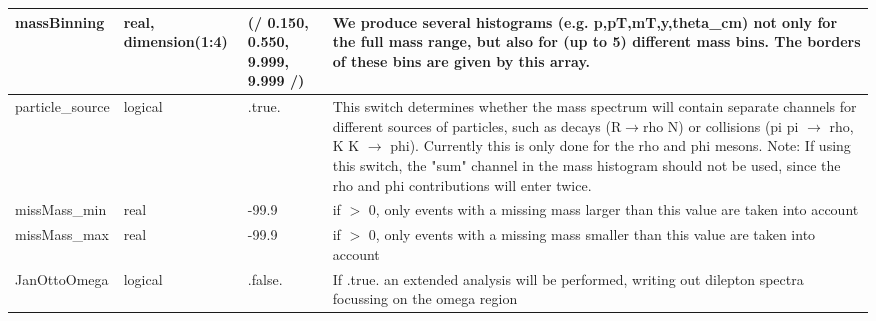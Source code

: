 \documentclass{article}
\begin{document}
\begin{longtable}{llll}
\midrule
massBinning & \begin{minipage}[t]{2cm}real, dimension(1:4)\end{minipage} & \begin{minipage}[t]{2cm}(/ 0.150, 0.550, 9.999, 9.999 /)\end{minipage} & \begin{minipage}[t]{12cm}We produce several histograms (e.g. p,pT,mT,y,theta\_cm) not only for the full mass range, but also for (up to 5) different mass bins. The borders of these bins are given by this array.\end{minipage}\\*
\midrule
particle\_source & \begin{minipage}[t]{2cm}logical\end{minipage} & \begin{minipage}[t]{2cm}.true.\end{minipage} & \begin{minipage}[t]{12cm}This switch determines whether the mass spectrum will contain separate channels for different sources of particles, such as decays (R$\rightarrow$rho N) or collisions (pi pi $\rightarrow$ rho, K K $\rightarrow$ phi). Currently this is only done for the rho and phi mesons. Note: If using this switch, the "sum" channel in the mass histogram should not be used, since the rho and phi contributions will enter twice.\end{minipage}\\*
\midrule
missMass\_min & \begin{minipage}[t]{2cm}real\end{minipage} & \begin{minipage}[t]{2cm}-99.9\end{minipage} & \begin{minipage}[t]{12cm}if $>$ 0, only events with a missing mass larger than this value are taken into account\end{minipage}\\*
\midrule
missMass\_max & \begin{minipage}[t]{2cm}real\end{minipage} & \begin{minipage}[t]{2cm}-99.9\end{minipage} & \begin{minipage}[t]{12cm}if $>$ 0, only events with a missing mass smaller than this value are taken into account\end{minipage}\\*
\midrule
JanOttoOmega & \begin{minipage}[t]{2cm}logical\end{minipage} & \begin{minipage}[t]{2cm}.false.\end{minipage} & \begin{minipage}[t]{12cm}If .true. an extended analysis will be performed, writing out dilepton spectra focussing on the omega region\end{minipage}\\*
\bottomrule
\end{longtable}
{ }
\end{document}
